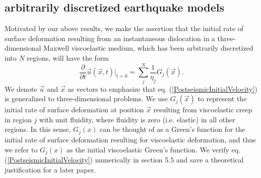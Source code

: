 \documentclass[extra,mreferee]{gji}
\begin{document}
\subsection{arbitrarily discretized earthquake models}
Motivated by our above results, we make the assertion that the initial
rate of surface deformation resulting from an instantaneous
dislocation in a three-dimensional Maxwell viscoelastic
medium, which has been arbitrarily discretized into $N$ regions, will
have the form
\begin{equation}\label{PostseismicInitialVelocity}
  \frac{\partial}{\partial t}\vec{u}(\vec{x},t)\big|_{t=0} = \sum_j^N\frac{1}{\eta_j}G_j(\vec{x}).
\end{equation}
We denote $\vec{u}$ and $\vec{x}$ as vectors to emphasize that
eq. (\ref{PostseismicInitialVelocity}) is generalized to
three-dimensional problems.  We use $G_j(\vec{x})$ to represent the
initial rate of surface deformation at position $\vec{x}$ resulting
from viscoelastic creep in region $j$ with unit fluidity, where
fluidity is zero (i.e. elastic) in all other regions.  In this sense,
$G_j(x)$ can be thought of as a Green's function for the initial rate
of surface deformation resulting for viscoelastic deformation, and
thus we refer to $G_j(x)$ as the initial viscoelastic Green's
function.  We verify eq. (\ref{PostseismicInitialVelocity})
numerically in section 5.5 and save a theoretical justification for a
later paper.
\end{document}
